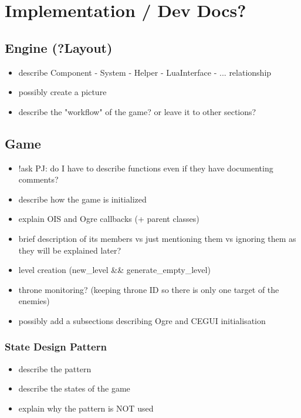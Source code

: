 \chapter{Implementation / Dev Docs?}

\section{Engine (?Layout)}

\begin{itemize}
    \item describe Component - System - Helper - LuaInterface - ... relationship
    \item possibly create a picture
    \item describe the "workflow" of the game? or leave it to other sections?
\end{itemize}

\section{Game}

\begin{itemize}
    \item !ask PJ: do I have to describe functions even if they have documenting comments? 
    \item describe how the game is initialized
    \item explain OIS and Ogre callbacks (+ parent classes)
    \item brief description of its members vs just mentioning them vs ignoring them as they will be explained later?
    \item level creation (new\_level \&\& generate\_empty\_level)
    \item throne monitoring? (keeping throne ID so there is only one target of the enemies)
    \item possibly add a subsections describing Ogre and CEGUI initialisation
\end{itemize}

\subsection{State Design Pattern}

\begin{itemize}
    \item describe the pattern
    \item describe the states of the game
    \item explain why the pattern is NOT used
\end{itemize}

